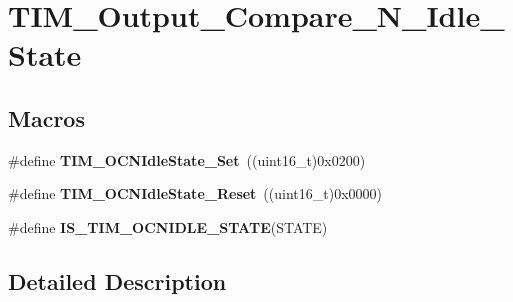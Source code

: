 \hypertarget{group___t_i_m___output___compare___n___idle___state}{\section{T\-I\-M\-\_\-\-Output\-\_\-\-Compare\-\_\-\-N\-\_\-\-Idle\-\_\-\-State}
\label{group___t_i_m___output___compare___n___idle___state}
}
\subsection*{Macros}
\begin{DoxyCompactItemize}
\item 
\hypertarget{group___t_i_m___output___compare___n___idle___state_ga980392da6eb5bedcbf7ed353e1073f99}{\#define {\bfseries T\-I\-M\-\_\-\-O\-C\-N\-Idle\-State\-\_\-\-Set}~((uint16\-\_\-t)0x0200)}\label{group___t_i_m___output___compare___n___idle___state_ga980392da6eb5bedcbf7ed353e1073f99}

\item 
\hypertarget{group___t_i_m___output___compare___n___idle___state_ga329a32820cdba0af9c4b7a04177e8fdd}{\#define {\bfseries T\-I\-M\-\_\-\-O\-C\-N\-Idle\-State\-\_\-\-Reset}~((uint16\-\_\-t)0x0000)}\label{group___t_i_m___output___compare___n___idle___state_ga329a32820cdba0af9c4b7a04177e8fdd}

\item 
\#define {\bfseries I\-S\-\_\-\-T\-I\-M\-\_\-\-O\-C\-N\-I\-D\-L\-E\-\_\-\-S\-T\-A\-T\-E}(S\-T\-A\-T\-E)
\end{DoxyCompactItemize}


\subsection{Detailed Description}


